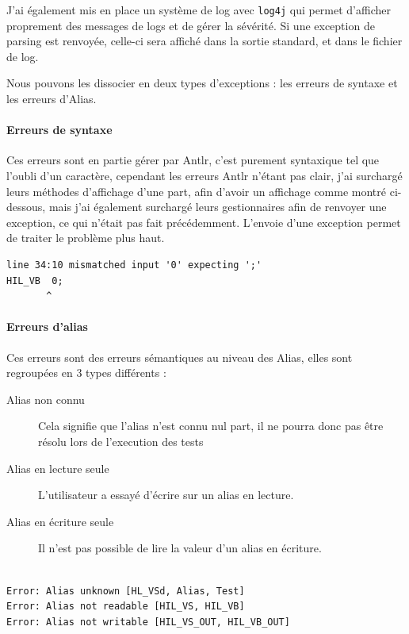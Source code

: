J'ai également mis en place un système de log avec \texttt{log4j} qui permet d'afficher proprement des messages de logs et de gérer la sévérité. Si une exception de parsing est renvoyée, celle-ci sera affiché dans la sortie standard, et dans le fichier de log.

Nous pouvons les dissocier en deux types d'exceptions : les erreurs de syntaxe et les erreurs d'Alias. 
\paragraph{Erreurs de syntaxe} Ces erreurs sont en partie gérer par Antlr, c'est purement syntaxique tel que l'oubli d'un caractère, cependant les erreurs Antlr n'étant pas clair, j'ai surchargé leurs méthodes d'affichage d'une part, afin d'avoir un affichage comme montré ci-dessous, mais j'ai également surchargé leurs gestionnaires afin de renvoyer une exception, ce qui n'était pas fait précédemment. L'envoie d'une exception permet de traiter le problème plus haut. 
\begin{lstlisting}[caption=Affichage d'une erreur de syntaxe, numbers=none]
line 34:10 mismatched input '0' expecting ';'
HIL_VB  0;
       ^
\end{lstlisting}


\paragraph{Erreurs d'alias} Ces erreurs sont des erreurs sémantiques au niveau des Alias, elles sont regroupées en 3 types différents : 
\begin{description}
	\item[Alias non connu] Cela signifie que l'alias n'est connu nul part, il ne pourra donc pas être résolu lors de l'execution des tests
	\item[Alias en lecture seule] L'utilisateur a essayé d'écrire sur un alias en lecture.
	\item[Alias en écriture seule] Il n'est pas possible de lire la valeur d'un alias en écriture.\\~
\end{description}

\begin{lstlisting}[caption=Affichage d'une erreur d'alias, numbers=none]
Error: Alias unknown [HL_VSd, Alias, Test]
Error: Alias not readable [HIL_VS, HIL_VB]
Error: Alias not writable [HIL_VS_OUT, HIL_VB_OUT]
\end{lstlisting}
		